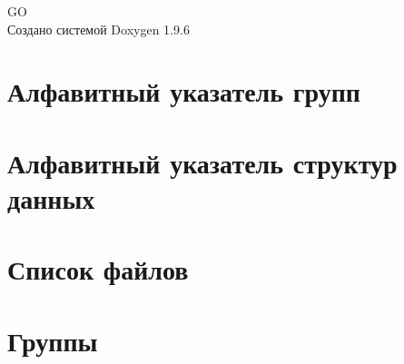 \documentclass[twoside]{book}
\newcommand{\+}{\discretionary{\mbox{\scriptsize$\hookleftarrow$}}{}{}}
\newcommand{\clearemptydoublepage}{%
    \newpage{\pagestyle{empty}\cleardoublepage}%
  }
\begin{document}
  \raggedbottom
    \hypersetup{pageanchor=false,
                bookmarksnumbered=true,
                pdfencoding=unicode
               }
  \begin{titlepage}
  \vspace*{7cm}
  \begin{center}%
  {\Large GO}\\
  \vspace*{1cm}
  {\large Создано системой Doxygen 1.9.6}\\
  \end{center}
  \end{titlepage}
  \clearemptydoublepage
  \tableofcontents
  \clearemptydoublepage
  \hypersetup{pageanchor=true}
\chapter{Алфавитный указатель групп}

\chapter{Алфавитный указатель структур данных}

\chapter{Список файлов}

\chapter{Группы}
















\end{document}
